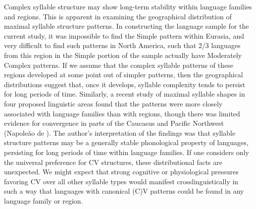   Complex syllable structure may show long-term stability within language families and regions. This is apparent in examining the geographical distribution of maximal syllable structure patterns. In constructing the language sample for the current study, it was impossible to find the Simple pattern within Eurasia, and very difficult to find such patterns in North America, such that 2/3 languages from this region in the Simple portion of the sample actually have Moderately Complex patterns. If we assume that the complex syllable patterns of these regions developed at some point out of simpler patterns, then the geographical distributions suggest that, once it develops, syllable complexity tends to persist for long periods of time. Similarly, a recent study of maximal syllable shapes in four proposed linguistic areas found that the patterns were more closely associated with language families than with regions, though there was limited evidence for convergence in parts of the Caucasus and Pacific Northwest (Napoleão de \citealt{Souza2017}). The author’s interpretation of the findings was that syllable structure patterns may be a generally stable phonological property of languages, persisting for long periods of time within language families. If one considers only the universal preference for CV structures, these distributional facts are unexpected. We might expect that strong cognitive or physiological pressures favoring CV over all other syllable types would manifest crosslinguistically in such a way that languages with canonical (C)V patterns could be found in any language family or region.

